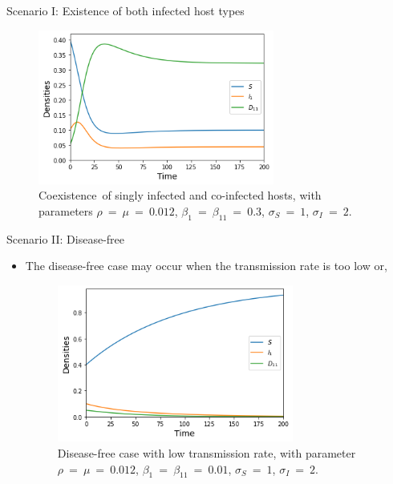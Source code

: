 \documentclass{beamer}
\begin{document}
	\begin{frame}{Scenario I: Existence of both infected host types}
		\begin{figure}[ht]
			\label{Figure 4}
			\begin{center}
				\includegraphics[width=220pt]{coexistence_of_singly_infected_and_coinfected_hosts.jpg}
			\end{center}
			\caption{Coexistence of singly infected and co-infected hosts, with parameters $\rho\ =\ \mu\ =\ 0.012$, $\beta_1\ =\ \beta_{11}\ =\ 0.3$, $\sigma_S\ =\ 1$, $\sigma_I\ =\ 2$.}
		\end{figure}
	\end{frame}

	\begin{frame}{Scenario II: Disease-free}
		\begin{itemize}
			\item The disease-free case may occur when the transmission rate is too low or,
			\vspace{1em}
			\begin{figure}[ht]
				\label{Figure 5}
				\begin{center}
					\includegraphics[width=220pt]{disease-free_with_low_transmission_rate.jpg}
				\end{center}
				\caption{Disease-free case with low transmission rate, with parameter $\rho\ =\ \mu\ =\ 0.012$, $\beta_1\ =\ \beta_{11}\ =\ 0.01$, $\sigma_S\ =\ 1$, $\sigma_I\ =\ 2$.}
			\end{figure}
		\end{itemize}
	\end{frame}
\end{document}
